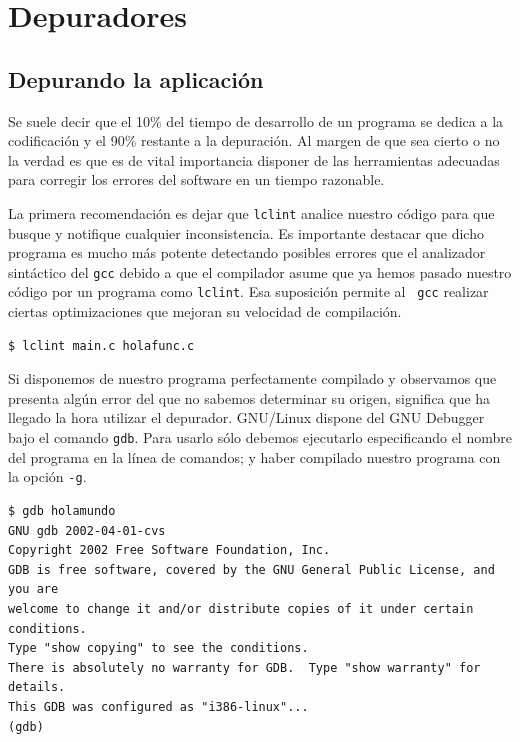 
\chapter{Depuradores}
\label{depuradores.tex}
\section{Depurando la aplicación}

Se suele decir que el 10\% del  tiempo de desarrollo de un programa se
dedica a la codificación y el 90\% restante a la depuración. Al margen
de  que sea  cierto o  no la  verdad es  que es  de vital  importancia
disponer de las  herramientas adecuadas para corregir  los errores del
software en un tiempo razonable.

La primera  recomendación es  dejar que  {\tt lclint}  analice nuestro
código  para  que  busque  y notifique  cualquier  inconsistencia.  Es
importante destacar que dicho programa es mucho más potente detectando
posibles errores que  el analizador sintáctico del {\tt  gcc} debido a
que  el  compilador asume  que  ya  hemos  pasado nuestro  código  por
un  programa  como  {\tt  lclint}.  Esa  suposición  permite  al  {\tt
gcc}  realizar  ciertas optimizaciones  que  mejoran  su velocidad  de
compilación.

\begin{verbatim}
$ lclint main.c holafunc.c
\end{verbatim}

Si disponemos de nuestro programa perfectamente compilado y observamos
que  presenta algún  error del  que no  sabemos determinar  su origen,
significa  que ha  llegado la  hora utilizar  el depurador.  GNU/Linux
dispone del {\sf  GNU Debugger} bajo el  comando {\tt gdb}\label{gdb}.
Para    usarlo  sólo  debemos
ejecutarlo  especificando  el  nombre  del programa  en  la  línea  de
comandos; y haber compilado nuestro programa con la opción {\tt -g}.

\begin{verbatim}
$ gdb holamundo
GNU gdb 2002-04-01-cvs
Copyright 2002 Free Software Foundation, Inc.
GDB is free software, covered by the GNU General Public License, and you are
welcome to change it and/or distribute copies of it under certain conditions.
Type "show copying" to see the conditions.
There is absolutely no warranty for GDB.  Type "show warranty" for details.
This GDB was configured as "i386-linux"...
(gdb) 
\end{verbatim}

